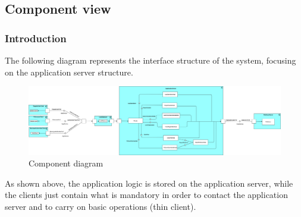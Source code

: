 \subsection{Component view}
\subsubsection{Introduction}
The following diagram represents the interface structure of the system, focusing on the application server structure. \newline
\begin{figure}[h!]
	\centering
	\includegraphics[width=\textwidth]{Images/component_diagram_beta}
	\caption{Component diagram}
\end{figure}

As shown above, the application logic is stored on the application server, while the clients just contain what is mandatory in order to contact the application server and to carry on basic operations  (thin client).\\
